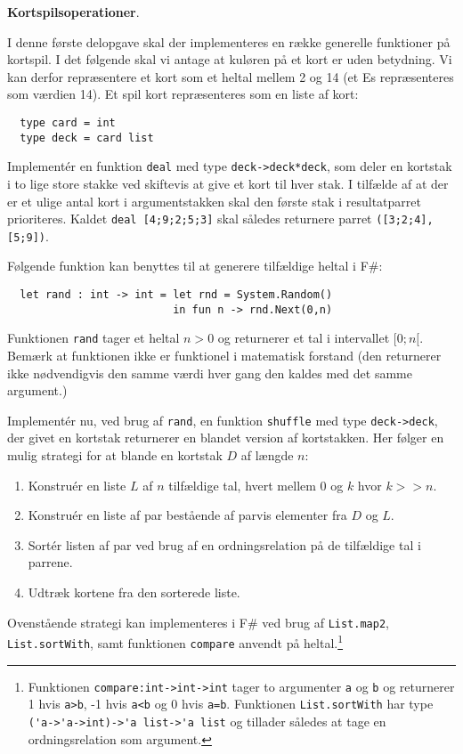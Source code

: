 \textbf{Kortspilsoperationer}.

I denne første delopgave skal der implementeres en række generelle
funktioner på kortspil. I det følgende skal vi antage at kuløren på et
kort er uden betydning. Vi kan derfor repræsentere et kort som et
heltal mellem 2 og 14 (et Es repræsenteres som værdien 14). Et spil
kort repræsenteres som en liste af kort:
\begin{lstlisting}
  type card = int
  type deck = card list
\end{lstlisting}

Implementér en funktion \lstinline{deal} med
type \lstinline{deck->deck*deck}, som deler en kortstak i to lige
store stakke ved skiftevis at give et kort til hver stak. I tilfælde
af at der er et ulige antal kort i argumentstakken skal den første
stak i resultatparret prioriteres. Kaldet \lstinline{deal [4;9;2;5;3]}
skal således returnere parret \lstinline{([3;2;4],[5;9])}.

Følgende funktion kan benyttes til at generere tilfældige heltal i F\#:
\begin{lstlisting}
  let rand : int -> int = let rnd = System.Random()
                          in fun n -> rnd.Next(0,n)
\end{lstlisting}
Funktionen \lstinline{rand} tager et heltal $n > 0$ og returnerer et tal
i intervallet $[0;n[$. Bemærk at funktionen ikke er funktionel i
matematisk forstand (den returnerer ikke nødvendigvis den samme værdi
hver gang den kaldes med det samme argument.)

Implementér nu, ved brug af \lstinline{rand}, en
funktion \lstinline{shuffle} med type \lstinline{deck->deck}, der
givet en kortstak returnerer en blandet version af
kortstakken. Her følger en mulig strategi for at blande en kortstak
$D$ af længde $n$:
\begin{enumerate}
\item Konstruér en liste $L$ af $n$ tilfældige tal, hvert mellem 0 og $k$ hvor $k >> n$.
\item Konstruér en liste af par bestående af parvis elementer fra $D$ og $L$.
\item Sortér listen af par ved brug af en ordningsrelation på de tilfældige tal i parrene.
\item Udtræk kortene fra den sorterede liste.
\end{enumerate}
Ovenstående strategi kan implementeres i F\# ved brug
af \lstinline{List.map2}, \lstinline{List.sortWith}, samt
funktionen \lstinline{compare} anvendt på
heltal.\footnote{Funktionen \lstinline{compare:int->int->int} tager to
argumenter \lstinline{a} og \lstinline{b} og returnerer 1
hvis \lstinline{a>b}, -1 hvis \lstinline{a<b} og 0
hvis \lstinline{a=b}. Funktionen \lstinline{List.sortWith} har
type \lstinline{('a->'a->int)->'a list->'a list} og tillader således
at tage en ordningsrelation som argument.}

